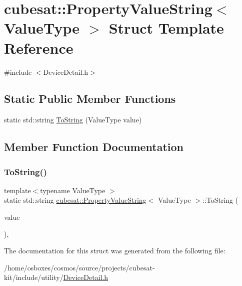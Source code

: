 \hypertarget{structcubesat_1_1PropertyValueString}{}\section{cubesat\+:\+:Property\+Value\+String$<$ Value\+Type $>$ Struct Template Reference}
\label{structcubesat_1_1PropertyValueString}


{\ttfamily \#include $<$Device\+Detail.\+h$>$}

\subsection*{Static Public Member Functions}
\begin{DoxyCompactItemize}
\item 
static std\+::string \hyperlink{structcubesat_1_1PropertyValueString_ad275e59a73a53965aa9fedb288124df7}{To\+String} (Value\+Type value)
\end{DoxyCompactItemize}


\subsection{Member Function Documentation}
\mbox{\label{structcubesat_1_1PropertyValueString_ad275e59a73a53965aa9fedb288124df7}} 
\subsubsection{\texorpdfstring{To\+String()}{ToString()}}
{\footnotesize\ttfamily template$<$typename Value\+Type $>$ \\
static std\+::string \hyperlink{structcubesat_1_1PropertyValueString}{cubesat\+::\+Property\+Value\+String}$<$ Value\+Type $>$\+::To\+String (\begin{DoxyParamCaption}\item[{Value\+Type}]{value }\end{DoxyParamCaption})\hspace{0.3cm}{\ttfamily [inline]}, {\ttfamily [static]}}



The documentation for this struct was generated from the following file\+:\begin{DoxyCompactItemize}
\item 
/home/osboxes/cosmos/source/projects/cubesat-\/kit/include/utility/\hyperlink{DeviceDetail_8h}{Device\+Detail.\+h}\end{DoxyCompactItemize}
